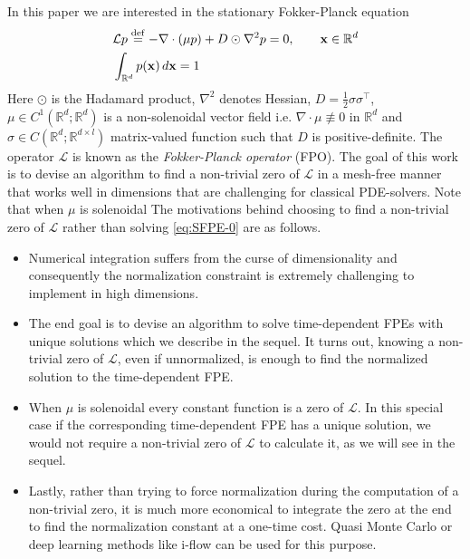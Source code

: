 In this paper we are interested in the stationary 
Fokker-Planck equation
\begin{equation}
\begin{aligned}
&\mathcal L p \stackrel{\rm def}{=}
  -\nabla \cdot(\mu p) + D\odot\nabla^2p=0,\qquad\mathbf x\in\mathbb R^d\\
  &\int_{\mathbb R^d}p(\mathbf x)\,d\mathbf x = 1\label{eq:SFPE-0}
\end{aligned}
\end{equation}
Here $\odot$ is the Hadamard product, $\nabla^2$ denotes Hessian, $D=\frac{1}{2}\sigma\sigma^\top$,  $\mu\in C^1(\mathbb R^d; \mathbb R^d)$ is a non-solenoidal vector field i.e. $\nabla\cdot\mu\not\equiv0$ in $\mathbb R^d$ and $\sigma\in C(\mathbb R^d; \mathbb R^{d\times l})$  matrix-valued function such that $D$ is positive-definite.
The operator $\mathcal L$ is known as the \textit{Fokker-Planck operator} (FPO). The goal of this work is to devise an algorithm to find a non-trivial zero of  $\mathcal L$ in a mesh-free manner that works well in dimensions that are challenging for classical PDE-solvers. Note that when $\mu$ is solenoidal The motivations behind choosing to find a non-trivial zero of $\mathcal L$ rather than solving \eqref{eq:SFPE-0} are as follows. 
\begin{itemize}
    \item Numerical integration suffers from the curse of dimensionality \cite{hinrichs2014curse} and consequently the normalization constraint is extremely challenging to implement in high dimensions.
    \item The end goal is to devise an algorithm to solve time-dependent FPEs with unique solutions which we describe in the sequel. It turns out, knowing a non-trivial zero of $\mathcal L$, even if unnormalized, is enough to find the normalized solution to the time-dependent FPE.
    \item When $\mu$ is solenoidal every constant function is a zero of $\mathcal L$. In this special case if the corresponding time-dependent FPE has a unique solution, we would not require a non-trivial zero of $\mathcal L$ to calculate it, as we will see in the sequel.
    \item Lastly, rather than trying to force normalization during the computation of a non-trivial zero, it is much more economical to integrate the zero at the end to find the normalization constant at a one-time cost. Quasi Monte Carlo \cite{leobacher2014introduction} or deep learning methods like i-flow \cite{gao2020flow} can be used for this purpose. 
\end{itemize}
 

